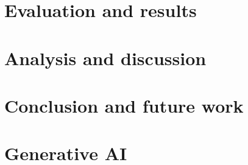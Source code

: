 \documentclass[conference]{IEEEtran}
\begin{document}
\section{Evaluation and results}


\section{Analysis and discussion}

\section{Conclusion and future work}




\section*{Generative AI}

\printbibliography


	
\end{document}
